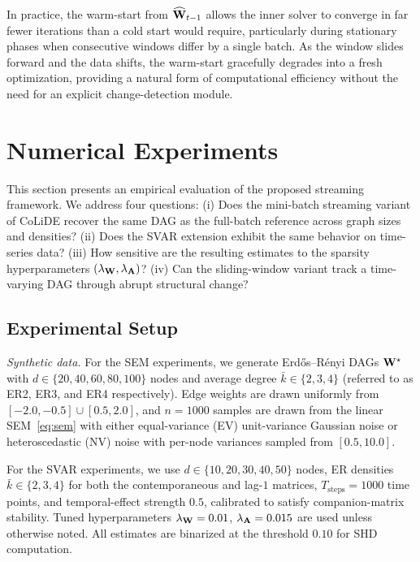 \documentclass[journal,twoside]{IEEEtran}
\begin{document}
In practice, the warm-start from $\widehat{{\mathbf W}}_{t-1}$ allows the
inner solver to converge in far fewer iterations than a cold start
would require, particularly during stationary phases when consecutive
windows differ by a single batch. As the window slides forward and the
data shifts, the warm-start gracefully degrades into a fresh
optimization, providing a natural form of computational efficiency
without the need for an explicit change-detection module.


\section{Numerical Experiments}
\label{sec:experiments}

This section presents an empirical evaluation of the proposed streaming
framework. We address four questions: (i) Does the mini-batch streaming
variant of CoLiDE recover the same DAG as the full-batch reference
across graph sizes and densities? (ii) Does the SVAR extension
exhibit the same behavior on time-series data? (iii) How sensitive
are the resulting estimates to the sparsity hyperparameters
$(\lambda_{{\mathbf W}}, \lambda_{{\mathbf A}})$? (iv) Can the sliding-window
variant track a time-varying DAG through abrupt structural change?

\subsection{Experimental Setup}
\label{sec:exp-setup}

\textit{Synthetic data.} For the SEM experiments, we generate
Erd\H{o}s--R\'enyi DAGs ${\mathbf W}^\star$ with $d \in \{20, 40, 60, 80,
100\}$ nodes and average degree $\bar{k} \in \{2, 3, 4\}$ (referred to
as ER2, ER3, and ER4 respectively). Edge weights are drawn uniformly
from $[-2.0, -0.5] \cup [0.5, 2.0]$, and $n = 1000$ samples are drawn
from the linear SEM~\eqref{eq:sem} with either equal-variance (EV)
unit-variance Gaussian noise or heteroscedastic (NV) noise with
per-node variances sampled from $[0.5, 10.0]$.

For the SVAR experiments, we use $d \in \{10, 20, 30, 40, 50\}$ nodes,
ER densities $\bar{k} \in \{2, 3, 4\}$ for both the contemporaneous and
lag-$1$ matrices, $T_\mathrm{steps} = 1000$ time points, and
temporal-effect strength $0.5$, calibrated to satisfy companion-matrix
stability. Tuned hyperparameters $\lambda_{{\mathbf W}} = 0.01$,
$\lambda_{{\mathbf A}} = 0.015$ are used unless otherwise noted. All
estimates are binarized at the threshold $0.10$ for SHD computation.
\end{document}
